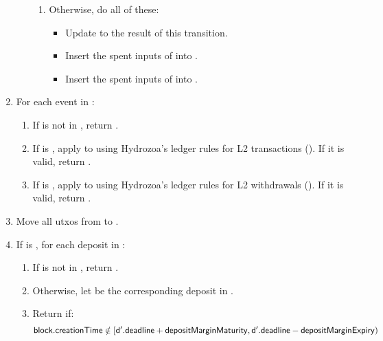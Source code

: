 \documentclass[../hydrozoa.tex]{subfiles}
\begin{document}
\begin{enumerate}
\begin{enumerate}
\begin{enumerate}
          \item Otherwise, do all of these:
            \begin{itemize}
              \item Update  to the result of this transition.
              \item Insert the spent inputs of  into .
              \item Insert the spent inputs of  into .
            \end{itemize}
        \end{enumerate}
    \end{enumerate}
  \item For each event  in :
    \begin{enumerate}
      \item If  is not in , return .
      \item If  is , apply  to  using Hydrozoa's ledger rules for L2 transactions (). If it is valid, return .
      \item If  is , apply  to  using Hydrozoa's ledger rules for L2 withdrawals (). If it is valid, return .
    \end{enumerate}
  \item Move all utxos from  to .
  \item If  is , for each deposit  in :
    \begin{enumerate}
      \item If  is not in , return .
      \item Otherwise, let  be the corresponding deposit in .
      \item Return  if:
        \begin{equation*}
          \T{block.creationTime} \notin [\T{d'.deadline} + \T{depositMarginMaturity}, \T{d'.deadline} - \T{depositMarginExpiry})

\end{equation*}
\end{enumerate}
\end{enumerate}
\end{document}
